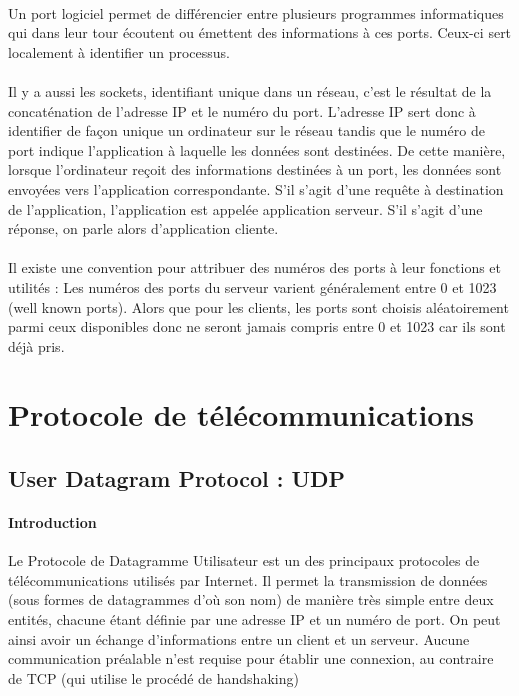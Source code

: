 \documentclass[12pt, oneside]{report}
\begin{document}
        \paragraph{}{Un port logiciel permet de différencier entre plusieurs programmes informatiques qui dans leur tour écoutent ou émettent des informations à ces ports. Ceux-ci sert localement à identifier un processus.
        
\paragraph{}Il y a aussi les sockets, identifiant unique dans un réseau, c’est le résultat de la concaténation de l’adresse IP et le numéro du port. 
L'adresse IP sert donc à identifier de façon unique un ordinateur sur le réseau tandis que le numéro de port indique l'application à laquelle les données sont destinées. De cette manière, lorsque l'ordinateur reçoit des informations destinées à un port, les données sont envoyées vers l'application correspondante. S'il s'agit d'une requête à destination de l'application, l'application est appelée application serveur. S'il s'agit d'une réponse, on parle alors d'application cliente.
\paragraph{}Il existe une convention pour attribuer des numéros des ports à leur fonctions et utilités :
Les numéros des ports du serveur varient généralement entre 0 et 1023 (well known ports).
Alors que pour les clients, les ports sont choisis aléatoirement parmi ceux disponibles donc ne seront jamais compris entre 0 et 1023 car ils sont déjà pris.
}
        \section{Protocole de télécommunications}
        \subsection{User Datagram Protocol : UDP}
        \paragraph{Introduction}{Le Protocole de Datagramme Utilisateur est un des principaux protocoles de télécommunications utilisés par Internet. Il permet la transmission de données (sous formes de datagrammes d'où son nom) de manière très simple entre deux entités, chacune étant définie par une adresse IP et un numéro de port. On peut ainsi avoir un échange d'informations entre un client et un serveur. Aucune communication préalable n'est requise pour établir une connexion, au contraire de TCP (qui utilise le procédé de handshaking)}
\end{document}
